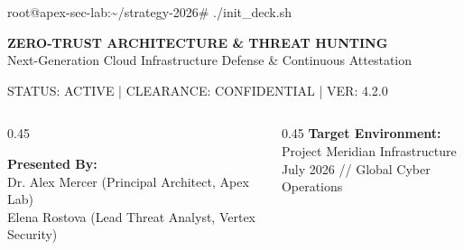 \documentclass[aspectratio=169, 10pt]{beamer}
\begin{document}
\begin{frame}[plain]
  \vfill
  \begin{terminalbox}{root@apex-sec-lab:\textasciitilde/strategy-2026\# ./init\_deck.sh}
    \vspace{4pt}
    \begin{center}
      {\ttfamily\color{cybercyan}\Large\bfseries ZERO-TRUST ARCHITECTURE \& THREAT HUNTING}\\[3pt]
      {\color{textmuted}\small Next-Generation Cloud Infrastructure Defense \& Continuous Attestation}\\[8pt]
      
      \begin{tcolorbox}[colback=bgcard, colframe=borderdark, arc=2pt, width=0.88\textwidth, halign=center, top=3pt, bottom=3pt]
        {\ttfamily\color{cybergreen}\small STATUS: ACTIVE \hspace{8pt}|\hspace{8pt} CLEARANCE: CONFIDENTIAL \hspace{8pt}|\hspace{8pt} VER: 4.2.0}
      \end{tcolorbox}
      \vspace{6pt}
      
      \begin{columns}
        \begin{column}{0.45\textwidth}
          \raggedright
          {\small\bfseries Presented By:}\\[1pt]
          {\color{cybercyan}\small Dr. Alex Mercer} {\color{textmuted}\tiny (Principal Architect, Apex Lab)}\\[1pt]
          {\color{cybercyan}\small Elena Rostova} {\color{textmuted}\tiny (Lead Threat Analyst, Vertex Security)}
        \end{column}
        \begin{column}{0.45\textwidth}
          \raggedleft
          {\small\bfseries Target Environment:}\\[1pt]
          {\color{textlight}\small Project Meridian Infrastructure}\\[1pt]
          {\color{textmuted}\tiny July 2026 // Global Cyber Operations}
        \end{column}
      \end{columns}
    \end{center}
    \vspace{2pt}
  \end{terminalbox}
  \vfill
\end{frame}
\end{document}
